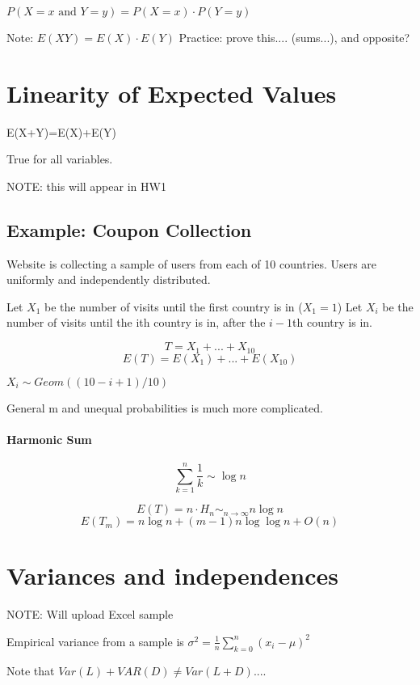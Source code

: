 \documentclass[a4paper]{article}
\begin{document}
$P(X=x\text{ and }Y=y)=P(X=x)\cdot P(Y=y)$

Note: $E(XY)=E(X)\cdot E(Y)$
Practice: prove this.... (sums...), and opposite?

\section{Linearity of Expected Values}

E(X+Y)=E(X)+E(Y)

True for all variables.

NOTE: this will appear in HW1

\subsection{Example: Coupon Collection}


Website is collecting a sample of users from each of 10 countries. Users are uniformly and independently distributed.


Let $X_1$ be the number of visits until the first country is in ($X_1=1$)
Let $X_i$ be the number of visits until the ith country is in, after the $i-1$th country is in.

\[T=X_1+...+X_{10}\]
\[E(T)=E(X_1)+...+E(X_{10})\]

$X_i\sim Geom((10-i+1)/10)$

General m and unequal probabilities is much more complicated.

\paragraph{Harmonic Sum}


\[\sum_{k=1}^n \frac{1}{k} \sim \log n\]

\[E(T)=n\cdot H_n\sim_{n \to \infty} n\log n\]
\[E(T_m)=n\log n+(m-1)n\log \log n+O(n)\]

\section{Variances and independences}

NOTE: Will upload Excel sample

Empirical variance from a sample is $\sigma^2=\frac{1}{n}\sum_{k=0}^n(x_i-\mu)^2$

Note that $Var(L)+VAR(D)\ne Var(L+D)$....
\end{document}

